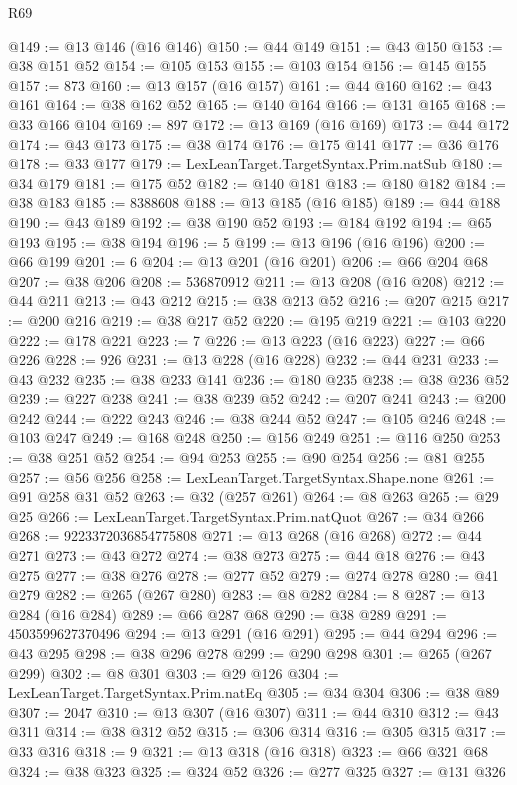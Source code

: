 \begin{lexlean}{R69}
\begin{coremodule}
@149 := @13 @146 (@16 @146)
@150 := @44 @149
@151 := @43 @150
@153 := @38 @151 @52
@154 := @105 @153
@155 := @103 @154
@156 := @145 @155
@157 := 873
@160 := @13 @157 (@16 @157)
@161 := @44 @160
@162 := @43 @161
@164 := @38 @162 @52
@165 := @140 @164
@166 := @131 @165
@168 := @33 @166 @104
@169 := 897
@172 := @13 @169 (@16 @169)
@173 := @44 @172
@174 := @43 @173
@175 := @38 @174
@176 := @175 @141
@177 := @36 @176
@178 := @33 @177
@179 := LexLeanTarget.TargetSyntax.Prim.natSub
@180 := @34 @179
@181 := @175 @52
@182 := @140 @181
@183 := @180 @182
@184 := @38 @183
@185 := 8388608
@188 := @13 @185 (@16 @185)
@189 := @44 @188
@190 := @43 @189
@192 := @38 @190 @52
@193 := @184 @192
@194 := @65 @193
@195 := @38 @194
@196 := 5
@199 := @13 @196 (@16 @196)
@200 := @66 @199
@201 := 6
@204 := @13 @201 (@16 @201)
@206 := @66 @204 @68
@207 := @38 @206
@208 := 536870912
@211 := @13 @208 (@16 @208)
@212 := @44 @211
@213 := @43 @212
@215 := @38 @213 @52
@216 := @207 @215
@217 := @200 @216
@219 := @38 @217 @52
@220 := @195 @219
@221 := @103 @220
@222 := @178 @221
@223 := 7
@226 := @13 @223 (@16 @223)
@227 := @66 @226
@228 := 926
@231 := @13 @228 (@16 @228)
@232 := @44 @231
@233 := @43 @232
@235 := @38 @233 @141
@236 := @180 @235
@238 := @38 @236 @52
@239 := @227 @238
@241 := @38 @239 @52
@242 := @207 @241
@243 := @200 @242
@244 := @222 @243
@246 := @38 @244 @52
@247 := @105 @246
@248 := @103 @247
@249 := @168 @248
@250 := @156 @249
@251 := @116 @250
@253 := @38 @251 @52
@254 := @94 @253
@255 := @90 @254
@256 := @81 @255
@257 := @56 @256
@258 := LexLeanTarget.TargetSyntax.Shape.none
@261 := @91 @258 @31 @52
@263 := @32 (@257 @261)
@264 := @8 @263
@265 := @29 @25
@266 := LexLeanTarget.TargetSyntax.Prim.natQuot
@267 := @34 @266
@268 := 9223372036854775808
@271 := @13 @268 (@16 @268)
@272 := @44 @271
@273 := @43 @272
@274 := @38 @273
@275 := @44 @18
@276 := @43 @275
@277 := @38 @276
@278 := @277 @52
@279 := @274 @278
@280 := @41 @279
@282 := @265 (@267 @280)
@283 := @8 @282
@284 := 8
@287 := @13 @284 (@16 @284)
@289 := @66 @287 @68
@290 := @38 @289
@291 := 4503599627370496
@294 := @13 @291 (@16 @291)
@295 := @44 @294
@296 := @43 @295
@298 := @38 @296 @278
@299 := @290 @298
@301 := @265 (@267 @299)
@302 := @8 @301
@303 := @29 @126
@304 := LexLeanTarget.TargetSyntax.Prim.natEq
@305 := @34 @304
@306 := @38 @89
@307 := 2047
@310 := @13 @307 (@16 @307)
@311 := @44 @310
@312 := @43 @311
@314 := @38 @312 @52
@315 := @306 @314
@316 := @305 @315
@317 := @33 @316
@318 := 9
@321 := @13 @318 (@16 @318)
@323 := @66 @321 @68
@324 := @38 @323
@325 := @324 @52
@326 := @277 @325
@327 := @131 @326

\end{coremodule}
\end{lexlean}
